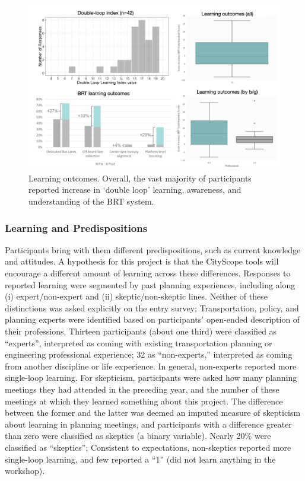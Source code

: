 {{        \begin{figure}[!htb]
            \begin{center}
                \includegraphics[width=1\textwidth]{chapters/consensus/BRT/figures/brt10.jpeg}
            \end{center}
            \caption{Learning outcomes. Overall, the vast majority of participants reported increase in `double loop' learning, awareness, and understanding of the BRT system.}
            \label{fig:brt_learning_outcomes}
        \end{figure}

        \subsubsection{Learning and Predispositions}

        {
            Participants bring with them different predispositions, such as current knowledge and attitudes. A hypothesis for this project is that the CityScope tools will encourage a different amount of learning across these differences. Responses to reported learning were segmented by past planning experiences, including along (i) expert/non-expert and (ii) skeptic/non-skeptic lines. Neither of these distinctions was asked explicitly on the entry survey; Transportation, policy, and planning experts were identified based on participants' open-ended description of their professions. Thirteen participants (about one third) were classified as ``experts'', interpreted as coming with existing transportation planning or engineering professional experience; 32 as ``non-experts,'' interpreted as coming from another discipline or life experience.
            \newline
            In general, non-experts reported more single-loop learning. For skepticism, participants were asked how many planning meetings they had attended in the preceding year, and the number of these meetings at which they learned something about this project. The difference between the former and the latter was deemed an imputed measure of skepticism about learning in planning meetings, and participants with a difference greater than zero were classified as skeptics (a binary variable). Nearly 20\% were classified as ``skeptics''; Consistent to expectations, non-skeptics reported more single-loop learning, and few reported a ``1'' (did not learn anything in the workshop).
        }


}}
